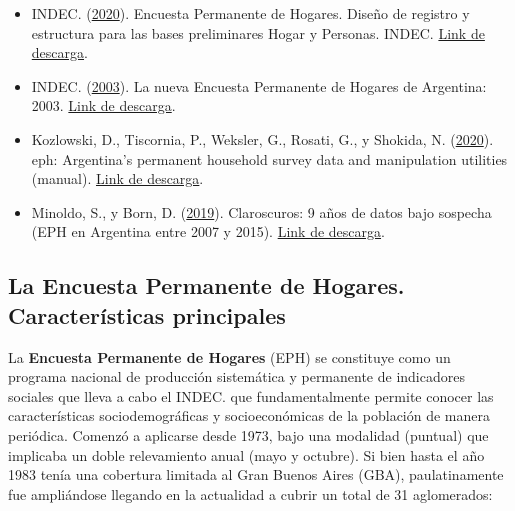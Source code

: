 \documentclass[
]{article}
\begin{document}
\begin{itemize}
\item
  INDEC. (\protect\hyperlink{ref-INDEC2020}{2020}). Encuesta Permanente de Hogares. Diseño de registro y estructura para las bases preliminares Hogar y Personas. INDEC. \href{https://www.indec.gob.ar/ftp/cuadros/menusuperior/eph/EPH_registro_1t20.pdf}{Link de descarga}.
\item
  INDEC. (\protect\hyperlink{ref-INDEC2003}{2003}). La nueva Encuesta Permanente de Hogares de Argentina: 2003. \href{https://www.indec.gob.ar/ftp/cuadros/sociedad/metodologia_eph_continua.pdf}{Link de descarga}.
\item
  Kozlowski, D., Tiscornia, P., Weksler, G., Rosati, G., y Shokida, N. (\protect\hyperlink{ref-kozlowski2020}{2020}). eph: Argentina's permanent household survey data and manipulation utilities (manual). \href{https://cloud.r-project.org/web/packages/eph/eph.pdf}{Link de descarga}.
\item
  Minoldo, S., y Born, D. (\protect\hyperlink{ref-Minoldo.Born2019}{2019}). Claroscuros: 9 años de datos bajo sospecha (EPH en Argentina entre 2007 y 2015). \href{https://issuu.com/cieseditora/docs/claroscuros_minoldo-born}{Link de descarga}.
\end{itemize}

\hypertarget{eph1}{%
\subsection{La Encuesta Permanente de Hogares. Características principales}\label{eph1}}

La \textbf{Encuesta Permanente de Hogares} (EPH) se constituye como un programa nacional de producción sistemática y permanente de indicadores sociales que lleva a cabo el INDEC. que fundamentalmente permite conocer las características sociodemográficas y socioeconómicas de la población de manera periódica. Comenzó a aplicarse desde 1973, bajo una modalidad (puntual) que implicaba un doble relevamiento anual (mayo y octubre). Si bien hasta el año 1983 tenía una cobertura limitada al Gran Buenos Aires (GBA), paulatinamente fue ampliándose llegando en la actualidad a cubrir un total de 31 aglomerados:
\end{document}
